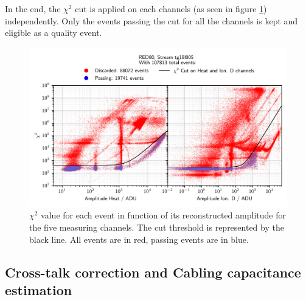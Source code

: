 In the end, the $\chi^2$ cut is applied on each channels (as seen in figure \ref{fig:chi2-cut}) independently. Only the events passing the cut for all the channels is kept and eligible as a quality event.

\begin{figure}
\centering
\includegraphics[width=\linewidth,]{Figures/ElectrodesExperimental/chi2_cut.png}
\caption{$\chi^2$ value for each event in function of its reconstructed amplitude for the five measuring channels. The cut threshold is represented by the black line. All events are in red, passing events are in blue.}
\label{fig:chi2-cut}
\end{figure}


\subsection{Cross-talk correction and Cabling capacitance estimation}

